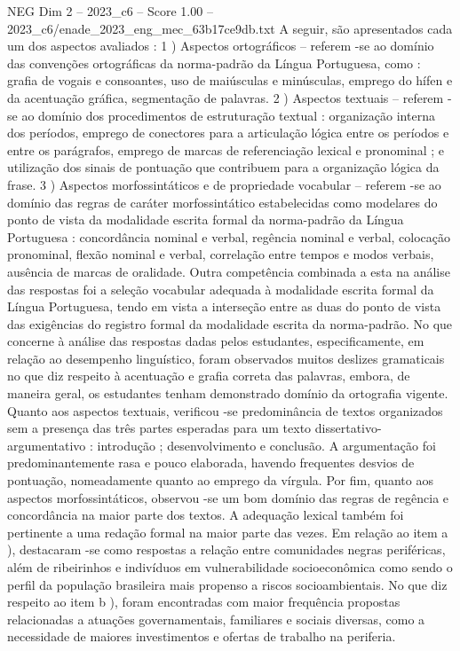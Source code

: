 \begin{textsample}{NEG Dim 2 – 2023\_c6 – Score 1.00 – 2023\_c6/enade\_2023\_eng\_mec\_63b17ce9db.txt}
A seguir, são apresentados cada um dos aspectos avaliados : 1 ) Aspectos ortográficos – referem -se ao domínio das convenções ortográficas da norma-padrão da Língua Portuguesa, como : grafia de vogais e consoantes, uso de maiúsculas e minúsculas, emprego do hífen e da acentuação gráfica, segmentação de palavras. 2 ) Aspectos textuais – referem -se ao domínio dos procedimentos de estruturação textual : organização interna dos períodos, emprego de conectores para a articulação lógica entre os períodos e entre os parágrafos, emprego de marcas de referenciação lexical e pronominal ; e utilização dos sinais de pontuação que contribuem para a organização lógica da frase. 3 ) Aspectos morfossintáticos e de propriedade vocabular – referem -se ao domínio das regras de caráter morfossintático estabelecidas como modelares do ponto de vista da modalidade escrita formal da norma-padrão da Língua Portuguesa : concordância nominal e verbal, regência nominal e verbal, colocação pronominal, flexão nominal e verbal, correlação entre tempos e modos verbais, ausência de marcas de oralidade.
Outra competência combinada a esta na análise das respostas foi a seleção vocabular adequada à modalidade escrita formal da Língua Portuguesa, tendo em vista a interseção entre as duas do ponto de vista das exigências do registro formal da modalidade escrita da norma-padrão.
No que concerne à análise das respostas dadas pelos estudantes, especificamente, em relação ao desempenho linguístico, foram observados muitos deslizes gramaticais no que diz respeito à acentuação e grafia correta das palavras, embora, de maneira geral, os estudantes tenham demonstrado domínio da ortografia vigente.
Quanto aos aspectos textuais, verificou -se predominância de textos organizados sem a presença das três partes esperadas para um texto dissertativo-argumentativo : introdução ; desenvolvimento e conclusão.
A argumentação foi predominantemente rasa e pouco elaborada, havendo frequentes desvios de pontuação, nomeadamente quanto ao emprego da vírgula.
Por fim, quanto aos aspectos morfossintáticos, observou -se um bom domínio das regras de regência e concordância na maior parte dos textos.
A adequação lexical também foi pertinente a uma redação formal na maior parte das vezes.
Em relação ao item a ), destacaram -se como respostas a relação entre comunidades negras periféricas, além de ribeirinhos e indivíduos em vulnerabilidade socioeconômica como sendo o perfil da população brasileira mais propenso a riscos socioambientais.
No que diz respeito ao item b ), foram encontradas com maior frequência propostas relacionadas a atuações governamentais, familiares e sociais diversas, como a necessidade de maiores investimentos e ofertas de trabalho na periferia.

\end{textsample}
